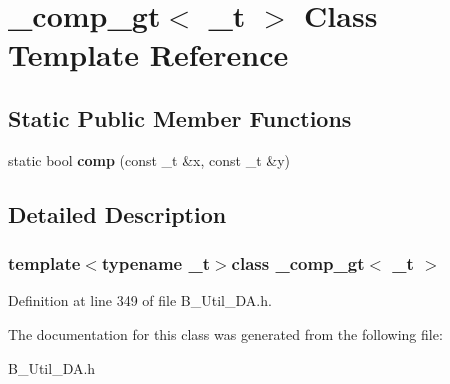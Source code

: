 \section{\-\_\-comp\-\_\-gt$<$ \-\_\-t $>$ Class Template Reference}
\label{class__comp__gt}
\subsection*{Static Public Member Functions}
\begin{DoxyCompactItemize}
\item 
static bool {\bfseries comp} (const \-\_\-t \&x, const \-\_\-t \&y)\label{class__comp__gt_a82581319ab397721d0ce28a9dc620d5d}

\end{DoxyCompactItemize}


\subsection{Detailed Description}
\subsubsection*{template$<$typename \-\_\-t$>$class \-\_\-comp\-\_\-gt$<$ \-\_\-t $>$}



Definition at line 349 of file B\-\_\-\-Util\-\_\-\-D\-A.\-h.



The documentation for this class was generated from the following file\-:\begin{DoxyCompactItemize}
\item 
B\-\_\-\-Util\-\_\-\-D\-A.\-h\end{DoxyCompactItemize}

